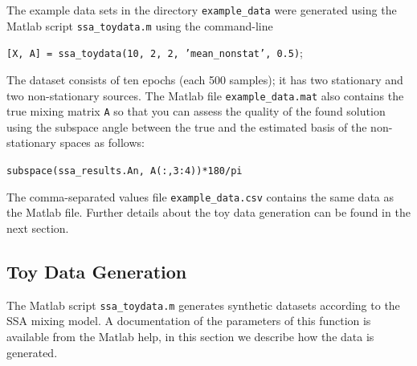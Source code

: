 \documentclass{article}
\newcommand{\1}{\ensuremath{\mathds{1}}}
\newcommand{\0}{\ensuremath{0}}
\begin{document}
The example data sets in the directory \texttt{example\_data} were generated using the Matlab 
script \texttt{ssa\_toydata.m} using the command-line
\begin{center}
	\texttt{[X, A] = ssa\_toydata(10, 2, 2, 'mean\_nonstat', 0.5)}; 
\end{center}
The dataset consists of ten epochs (each 500 samples); it has two stationary and two non-stationary 
sources. The Matlab file \texttt{example\_data.mat} also contains the true mixing matrix \texttt{A} 
so that you can assess the quality of the found solution using the subspace angle between the true
and the estimated basis of the non-stationary spaces as follows:
\begin{center}
	\texttt{subspace(ssa\_results.An, A(:,3:4))*180/pi}  
\end{center}
The comma-separated values file \texttt{example\_data.csv} contains the same data as the Matlab file. 
Further details about the toy data generation can be found in the next section. 

\subsection{Toy Data Generation}

The Matlab script \texttt{ssa\_toydata.m} generates synthetic datasets according to the SSA mixing 
model. A documentation of the parameters of this function is available from the Matlab help, in this 
section we describe how the data is generated. 
\end{document}
